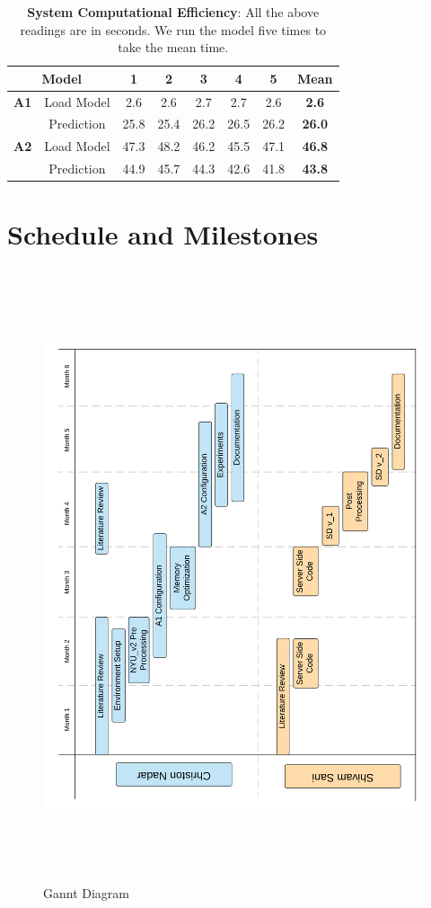\begin{table}[!]
\centering
\begin{tabular}{|c|c|c|c|c|c|c|c|}
\hline
\multicolumn{2}{|c|}{\textbf{Model}}      & \textbf{1} & \textbf{2} & \textbf{3} & \textbf{4} & \textbf{5} & \textbf{Mean} \\ \hline
\textbf{A1} & Load Model & 2.6        & 2.6        & 2.7        & 2.7        & 2.6        & \textbf{2.6}  \\ \cline{2-8} 
                             & Prediction & 25.8       & 25.4       & 26.2       & 26.5       & 26.2       & \textbf{26.0} \\ \hline
\textbf{A2} & Load Model & 47.3       & 48.2       & 46.2       & 45.5       & 47.1       & \textbf{46.8} \\ \cline{2-8} 
                             & Prediction & 44.9       & 45.7       & 44.3       & 42.6       & 41.8       & \textbf{43.8} \\ \hline
\end{tabular}
\caption{\textbf{System Computational Efficiency}: All the above readings are in seconds. We run the model five times to take the mean time.}
\label{table:ModelComputationaleff}
\end{table}

\newpage



\section{Schedule and Milestones}
\begin{figure}[h]
\centering
    \includegraphics[width=14cm, height=18cm]{Figures/ganntL2.png}
 \caption{Gannt Diagram}
    \label{fig:Gannt_Dia}
\end{figure}
\newpage

